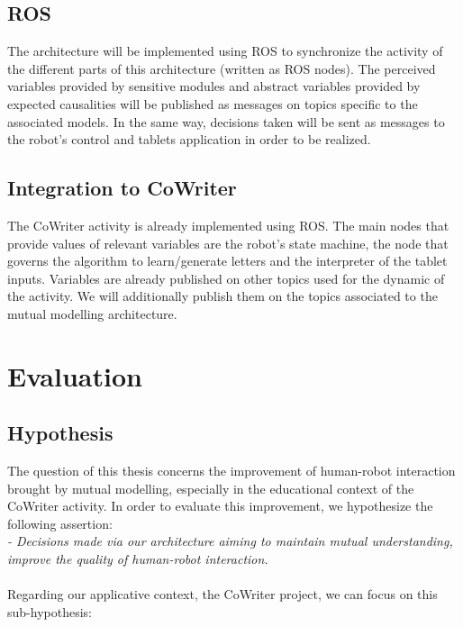 \documentclass[10pt,a4paper]{article}
\begin{document}
\subsection{ROS} 

The architecture will be implemented using ROS to synchronize the activity of the different parts of this architecture (written as ROS nodes). The perceived variables provided by sensitive modules and abstract variables provided by expected causalities will be published as messages on topics specific to the associated models. In the same way, decisions taken will be sent as messages to the robot's control and tablets application in order to be realized. 

\subsection{Integration to CoWriter}

The CoWriter activity is already implemented using ROS. The main nodes that provide values of relevant variables are the robot's state machine, the node that governs the algorithm to learn/generate letters and the interpreter of the tablet inputs. Variables are already published on other topics used for the dynamic of the activity. We will additionally publish them on the topics associated to the mutual modelling architecture. 

\section{Evaluation}\label{eval}

\subsection{Hypothesis}

The question of this thesis concerns the improvement of human-robot interaction brought by mutual modelling, especially in the educational context of the CoWriter activity. In order to evaluate this improvement, we hypothesize the following assertion:\\

\textit{- Decisions made via our architecture aiming to maintain mutual understanding, improve the quality of human-robot interaction.}\\
\\
Regarding our applicative context, the CoWriter project, we can focus on this sub-hypothesis:\\
\end{document}
